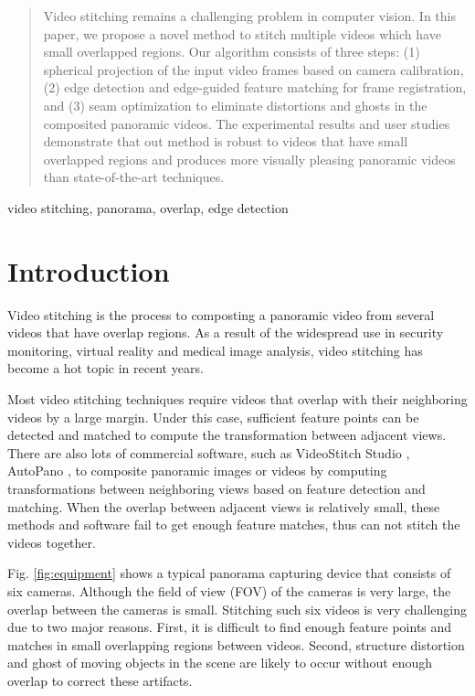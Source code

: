 \documentclass[conference]{IEEEtran}
\begin{document}
\begin{abstract}
Video stitching remains a challenging problem in computer vision. In this paper, we propose a novel method to stitch multiple videos which have small overlapped regions.
Our algorithm consists of three steps: (1) spherical projection of the input video frames based on camera calibration, (2) edge detection and edge-guided feature matching for frame registration, and (3) seam optimization to eliminate distortions and ghosts in the composited panoramic videos. 
%
The experimental results and user studies 
demonstrate that out method is robust to videos that have small overlapped regions and produces more visually pleasing panoramic videos than state-of-the-art techniques.
\end{abstract}

\begin{IEEEkeywords}
video stitching, panorama, overlap, edge detection
\end{IEEEkeywords}

\section{Introduction}
\label{sec:intro}

Video stitching is the process to composting a panoramic video from several videos that have overlap regions. %
As a result of the widespread
use in security monitoring, virtual reality and medical image
analysis, video stitching has become a hot topic in recent years.

Most video stitching techniques \cite{zheng2008stitching, guo2016joint, Jiang_2015_CVPR_Workshops, nie2018dynamic} require videos that overlap with
their neighboring videos by a large margin.
Under this case, sufficient feature points can be detected and matched to compute the transformation between adjacent views.
There are also lots of commercial software, such as VideoStitch Studio \cite{videostitching}, AutoPano \cite{autopano}, to composite panoramic images or videos by computing transformations between neighboring views based on feature detection and matching.
When the overlap between adjacent views is relatively small, these methods and software fail to get enough feature matches, thus can not stitch the videos together.

Fig. \ref{fig:equipment} shows a typical panorama capturing device that consists of six cameras. 
Although the field of view (FOV) of the cameras is very large, the overlap between the cameras is small. 
Stitching such six videos is very challenging due to two
major reasons. First, it is difficult to find enough feature points and matches in small overlapping regions between videos. Second, structure distortion and ghost of moving objects in the scene are likely to occur without enough overlap to correct these artifacts. 
\end{document}
